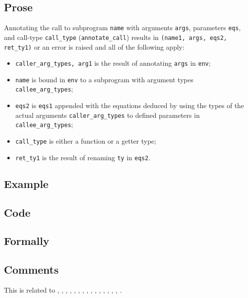 \documentclass{book}
\begin{document}
  \subsection{Prose}
  Annotating the call to subprogram \texttt{name} with arguments \texttt{args},
  parameters \texttt{eqs}, and call-type \texttt{call\_type}
  (\texttt{annotate\_call}) results in \texttt{(name1, args, eqs2, ret\_ty1)}
  or an error is raised and all of the following apply:
   \begin{itemize}
   \item \texttt{caller\_arg\_types, arg1} is the result of annotating \texttt{args} in \texttt{env};
   \item \texttt{name} is bound in \texttt{env} to a subprogram with argument types
      \\ \texttt{callee\_arg\_types};
   \item \texttt{eqs2} is \texttt{eqs1} appended with the equations deduced by
     using the types of the actual arguments \texttt{caller\_arg\_types} to
     defined parameters in \\ \texttt{callee\_arg\_types};
   \item \texttt{call\_type} is either a function or a getter type;
   \item \texttt{ret\_ty1} is the result of renaming \texttt{ty} in \texttt{eqs2}.
   \end{itemize}

  \subsection{Example}

  \subsection{Code}

\begin{emptyformal}
    \subsection{Formally}
\end{emptyformal}

\subsection{Comments}
  This is related to , , ,
  , , , , ,
  , , , , ,
  , , .
\end{document}
